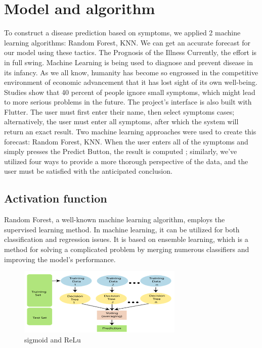 \section{Model and algorithm}
\label{chap:apprModel and algorithmoach}
To construct a disease prediction based on symptoms, we applied 2 machine learning algorithms: 
 Random Forest, KNN. We can get an accurate forecast for our model using
 these tactics. The Prognosis of the Illness Currently, the effort is in full swing. Machine Learning is
  being used to diagnose and prevent disease in its infancy. As we all know, humanity has become so engrossed 
  in the competitive environment of economic advancement that it has lost sight of its own well-being. Studies
   show that 40 percent of people ignore small symptoms, which might lead to more serious problems in the future. 
   The project's interface is also built with Flutter. The user must first enter their
    name, then select symptoms cases; alternatively, the user must enter all symptoms, after which 
    the system will return an exact result. Two machine learning approaches were used to create this forecast:
   Random Forest, KNN. When the user enters all of the symptoms and simply 
     presses the Predict Button, the result is computed ; similarly, we've utilized four
      ways to provide a more thorough perspective of the data, and the user must be satisfied with the anticipated 
      conclusion.

\subsection{Activation function}
\label{sec:Activation function}
  Random Forest, a well-known machine learning algorithm, employs the supervised learning method. In machine learning, 
  it can be utilized for both classification and regression issues. It is based on ensemble learning, which is a method for
   solving a complicated problem by merging numerous classifiers and improving the model's performance.
    \begin{figure}[htp]
        \centering
        \includegraphics[width=0.7\textwidth]{images/randomforest.png }
        \caption{sigmoid and ReLu }
        \label{fig:example4}
    \end{figure}
  
